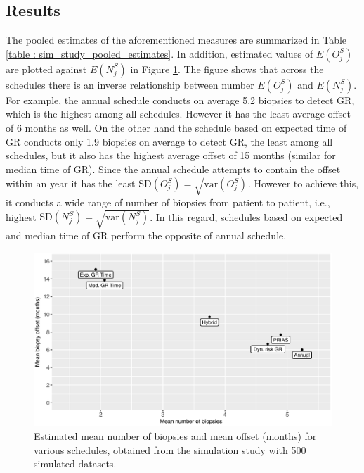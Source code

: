\subsection{Results}
The pooled estimates of the aforementioned measures are summarized in Table \ref{table : sim_study_pooled_estimates}. In addition, estimated values of $E(O^S_j)$ are plotted against $E(N^S_j)$ in Figure \ref{fig : meanNbVsOffset}. The figure shows that across the schedules there is an inverse relationship between number $E(O^S_j)$ and $E(N^S_j)$. For example, the annual schedule conducts on average 5.2 biopsies to detect GR, which is the highest among all schedules. However it has the least average offset of 6 months as well. On the other hand the schedule based on expected time of GR conducts only 1.9 biopsies on average to detect GR, the least among all schedules, but it also has the highest average offset of 15 months (similar for median time of GR). Since the annual schedule attempts to contain the offset within an year it has the least $\mbox{SD}(O^S_j) = \sqrt{\mbox{var}(O^S_j)}$. However to achieve this, it conducts a wide range of number of biopsies from patient to patient, i.e., highest $\mbox{SD}(N^S_j) = \sqrt{\mbox{var}(N^S_j)}$. In this regard, schedules based on expected and median time of GR perform the opposite of annual schedule.

\begin{figure}
\centerline{\includegraphics[width=\columnwidth]{images/sim_study/meanNbVsOffset_all.eps}}
\caption{Estimated mean number of biopsies and mean offset (months) for various schedules, obtained from the simulation study with 500 simulated datasets.}
\label{fig : meanNbVsOffset}
\end{figure}

